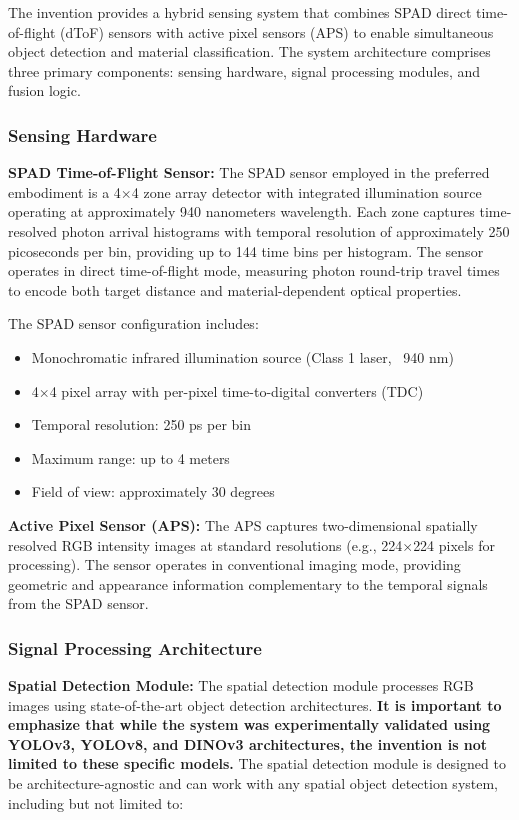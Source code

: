 \documentclass[11pt,a4paper]{article}
\begin{document}
\begin{enumerate}[leftmargin=*,label=\alph*)]
The invention provides a hybrid sensing system that combines SPAD direct time-of-flight (dToF) sensors with active pixel sensors (APS) to enable simultaneous object detection and material classification. The system architecture comprises three primary components: sensing hardware, signal processing modules, and fusion logic.

\subsubsection{Sensing Hardware}

\textbf{SPAD Time-of-Flight Sensor:}
The SPAD sensor employed in the preferred embodiment is a 4$\times$4 zone array detector with integrated illumination source operating at approximately 940 nanometers wavelength. Each zone captures time-resolved photon arrival histograms with temporal resolution of approximately 250 picoseconds per bin, providing up to 144 time bins per histogram. The sensor operates in direct time-of-flight mode, measuring photon round-trip travel times to encode both target distance and material-dependent optical properties.

The SPAD sensor configuration includes:
\begin{itemize}[leftmargin=*]
\item Monochromatic infrared illumination source (Class 1 laser, ~940 nm)
\item 4$\times$4 pixel array with per-pixel time-to-digital converters (TDC)
\item Temporal resolution: 250 ps per bin
\item Maximum range: up to 4 meters
\item Field of view: approximately 30 degrees
\end{itemize}

\textbf{Active Pixel Sensor (APS):}
The APS captures two-dimensional spatially resolved RGB intensity images at standard resolutions (e.g., 224$\times$224 pixels for processing). The sensor operates in conventional imaging mode, providing geometric and appearance information complementary to the temporal signals from the SPAD sensor.

\subsubsection{Signal Processing Architecture}

\textbf{Spatial Detection Module:}
The spatial detection module processes RGB images using state-of-the-art object detection architectures. \textbf{It is important to emphasize that while the system was experimentally validated using YOLOv3, YOLOv8, and DINOv3 architectures, the invention is not limited to these specific models.} The spatial detection module is designed to be architecture-agnostic and can work with any spatial object detection system, including but not limited to:


\end{enumerate}
\end{document}
